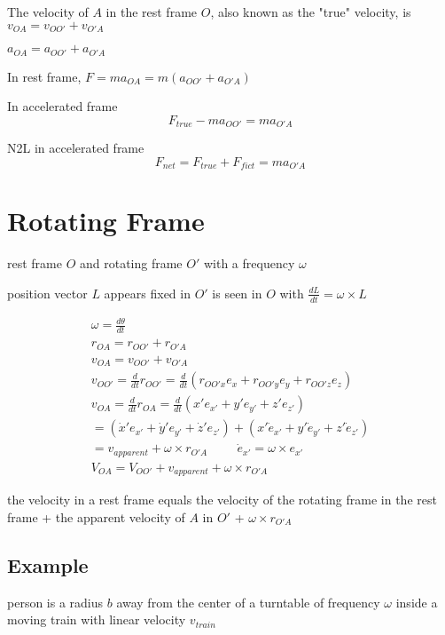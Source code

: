 \documentclass[fleqn]{report}
\newcommand{\hp}{\hspace{1cm}}
\newcommand{\equations} [1] {
\begin{gather*}
#1
\end{gather*}
}
\begin{document}
The velocity of $A$ in the rest frame $O$, also known as the "true" velocity, 
is $v_{OA} = v_{O O'} + v_{O' A}$

$a_{O A} = a_{O O'} + a_{O' A}$

In rest frame, $F = m a_{O A} = m(a_{O O'} + a_{O' A})$

In accelerated frame 
\[
F_{true} - m a_{O O'} = m a_{O' A}
\]

N2L in accelerated frame 
\[
    F_{net} = F_{true} + F_{fict} = m a_{O' A} 
\]


\section{Rotating Frame}
rest frame $O$ and rotating frame $O'$ with a frequency $\omega$

position vector $L$ appears fixed in $O'$ is seen in 
$O$ with $\frac{dL}{dt} = \omega \times L$

\equations{
    \omega = \frac{d \theta}{dt}
    \\
    r_{OA} = r_{O O'} + r_{O' A}
    \\
    v_{OA} = v_{O O'} + v_{O' A}
    \\
    v_{O O'} = 
    \frac{d}{dt} r_{O O'} = \frac{d}{dt} 
    \left(
        r_{O O' x} e_x + 
        r_{O O' y} e_y + 
        r_{O O' z} e_z 
    \right)
    \\
    v_{OA} = \frac{d}{dt} r_{OA} =
    \frac{d}{dt}
    \left(
        x' e_{x'} + 
        y' e_{y'} + 
        z' e_{z'} 
    \right)
    \\
    =
    \left(
        \dot x' e_{x'} + 
        \dot y' e_{y'} + 
        \dot z' e_{z'} 
    \right)
    +
    \left(
        x' \dot e_{x'} + 
        y' \dot e_{y'} + 
        z' \dot e_{z'} 
    \right)
    \\
    =
    v_{apparent} + \omega \times r_{O' A}
    \hp 
    \dot e_{x'} = \omega \times e_{x'}
    \\
    V_{O A} = V_{O O'} + v_{apparent} + \omega \times r_{O' A}
}

the velocity in a rest frame equals the velocity of the rotating frame in the 
rest frame + the apparent velocity of $A$ in $O'$ + $\omega \times r_{O' A}$

\subsection{Example}
person is a radius $b$ away from the center of a turntable of frequency $\omega$ 
inside a moving train with linear velocity $v_{train}$
\end{document}
